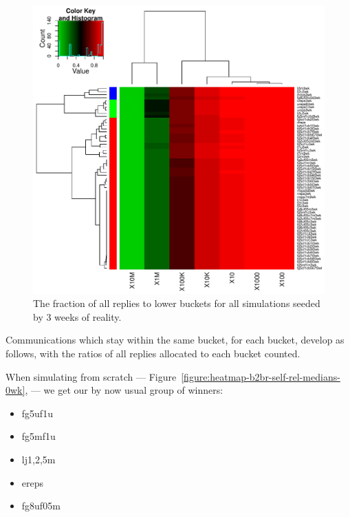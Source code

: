 \documentclass[10pt,oneside]{memoir}
\begin{document}
\begin{Spacing}{2}
\begin{figure}
\begin{center}
    \includegraphics{figures/crop/heatmap-b2br-aftr-rel-medians-3wk}
    \caption{The fraction of all replies to lower buckets for all simulations seeded by 3 weeks of reality.}
    \label{figure:heatmap-b2br-aftr-rel-medians-3wk}
\end{center}
\end{figure}
Communications which stay within the same bucket, for each bucket, develop as follows, with the ratios of all replies allocated to each bucket counted.


When simulating from scratch --- Figure~\ref{figure:heatmap-b2br-self-rel-medians-0wk}, --- we get our by now usual group of winners:


\begin{itemize}


\item fg5uf1u

\item fg5mf1u

\item lj{1,2,5}m

\item ereps




\item fg8uf05m





\end{itemize}
\end{Spacing}
\end{document}
